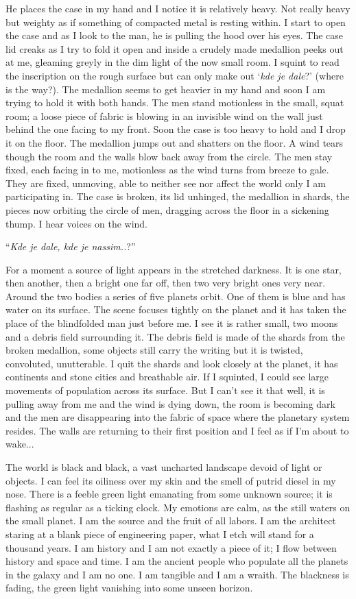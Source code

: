 He places the case in my hand and I notice it is relatively heavy. Not
really heavy but weighty as if something of compacted metal is resting
within. I start to open the case and as I look to the man, he is pulling
the hood over his eyes. The case lid creaks as I try to fold it open and
inside a crudely made medallion peeks out at me, gleaming greyly in the
dim light of the now small room. I squint to read the inscription on the
rough surface but can only make out `\emph{kde je dale}?' (where is the
way?). The medallion seems to get heavier in my hand and soon I am
trying to hold it with both hands. The men stand motionless in the
small, squat room; a loose piece of fabric is blowing in an invisible
wind on the wall just behind the one facing to my front. Soon the case
is too heavy to hold and I drop it on the floor. The medallion jumps out
and shatters on the floor. A wind tears though the room and the walls
blow back away from the circle. The men stay fixed, each facing in to
me, motionless as the wind turns from breeze to gale. They are fixed,
unmoving, able to neither see nor affect the world only I am
participating in. The case is broken, its lid unhinged, the medallion in
shards, the pieces now orbiting the circle of men, dragging across the
floor in a sickening thump. I hear voices on the wind.

``\emph{Kde je dale, kde je nassim..}?''

For a moment a source of light appears in the stretched darkness. It is
one star, then another, then a bright one far off, then two very bright
ones very near. Around the two bodies a series of five planets orbit.
One of them is blue and has water on its surface. The scene focuses
tightly on the planet and it has taken the place of the blindfolded man
just before me. I see it is rather small, two moons and a debris field
surrounding it. The debris field is made of the shards from the broken
medallion, some objects still carry the writing but it is twisted,
convoluted, unutterable. I quit the shards and look closely at the
planet, it has continents and stone cities and breathable air. If I
squinted, I could see large movements of population across its surface.
But I can't see it that well, it is pulling away from me and the wind is
dying down, the room is becoming dark and the men are disappearing into
the fabric of space where the planetary system resides. The walls are
returning to their first position and I feel as if I'm about to wake...

The world is black and black, a vast uncharted landscape devoid of light
or objects. I can feel its oiliness over my skin and the smell of putrid
diesel in my nose. There is a feeble green light emanating from some
unknown source; it is flashing as regular as a ticking clock. My
emotions are calm, as the still waters on the small planet. I am the
source and the fruit of all labors. I am the architect staring at a
blank piece of engineering paper, what I etch will stand for a thousand
years. I am history and I am not exactly a piece of it; I flow between
history and space and time. I am the ancient people who populate all the
planets in the galaxy and I am no one. I am tangible and I am a wraith.
The blackness is fading, the green light vanishing into some unseen
horizon.

